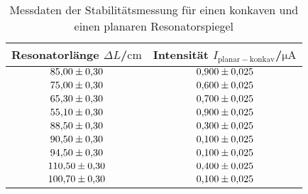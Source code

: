 \begin{table}
 \caption{Messdaten der Stabilitätsmessung für einen konkaven und einen planaren Resonatorspiegel}
 \label{tab:stabilitaetpk}
 \centering
{} \begin{tabular}{SS}
 \toprule 
    {Resonatorlänge $\Delta L$/$\si{\centi\meter}$}& {Intensität $I_{\mathrm{planar-konkav}}$/$\si{\micro\ampere}$} \\
     \midrule
     $\num{85.00 \pm 0.30}$ & $\num{0.900\pm0.025}$ \\
     $\num{75.00 \pm 0.30}$ & $\num{0.600\pm0.025}$ \\
     $\num{65.30 \pm 0.30}$ & $\num{0.700\pm0.025}$ \\
     $\num{55.10 \pm 0.30}$ & $\num{0.900\pm0.025}$ \\
     $\num{88.50 \pm 0.30}$ & $\num{0.300\pm0.025}$ \\
     $\num{90.50 \pm 0.30}$ & $\num{0.100\pm0.025}$ \\
     $\num{94.50 \pm 0.30}$ & $\num{0.100\pm0.025}$ \\
     $\num{110.50 \pm 0.30}$ & $\num{0.400\pm0.025}$ \\
     $\num{100.70 \pm 0.30}$ & $\num{0.100\pm0.025}$ \\
 \bottomrule
 \end{tabular}
\end{table}